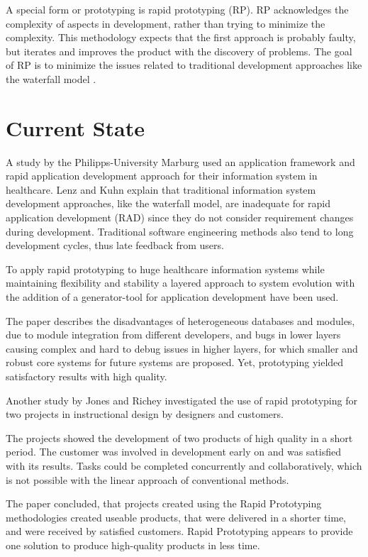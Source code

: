 \documentclass[runningheads]{llncs}
\begin{document}
A special form or prototyping is rapid prototyping (RP). RP acknowledges the complexity of aspects in development, rather than trying to minimize 
the complexity. This methodology expects that the first approach is probably faulty, but iterates and improves the product with the discovery of
problems. The goal of RP is to minimize the issues related to traditional development approaches like the waterfall model \cite{ref_RPalternativeStrategy}.


\section{Current State}
A study by the Philipps-University Marburg \cite{ref_health} used an application framework and
rapid application development approach for their information system in healthcare.
Lenz and Kuhn\cite{ref_health} explain that traditional information system development approaches, like
the waterfall model, are inadequate for rapid application development (RAD) since they do not consider 
requirement changes during development. Traditional software engineering methods also tend to long development cycles, 
thus late feedback from users.

To apply rapid prototyping to huge healthcare information systems while maintaining flexibility and stability
a layered approach to system evolution with the addition of a generator-tool for application development 
have been used. 

The paper describes the disadvantages of heterogeneous databases and modules, due to module integration
from different developers, and bugs in lower layers causing complex and hard to debug issues in higher layers, 
for which smaller and robust core systems for future systems are proposed. Yet, prototyping yielded 
satisfactory results with high quality.

Another study by Jones and Richey \cite{ref_RPInAction} investigated the use of rapid prototyping for 
two projects in instructional design by designers and customers. 

The projects showed the development of two products of high quality in a short period. The customer
was involved in development early on and was satisfied with its results. Tasks could be completed concurrently
and collaboratively, which is not possible with the linear approach of conventional methods.

The paper concluded, that projects created using the Rapid Prototyping methodologies created useable products, that were 
delivered in a shorter time, and were received by satisfied customers. Rapid Prototyping appears to provide one solution 
to produce high-quality products in less time.
\end{document}
